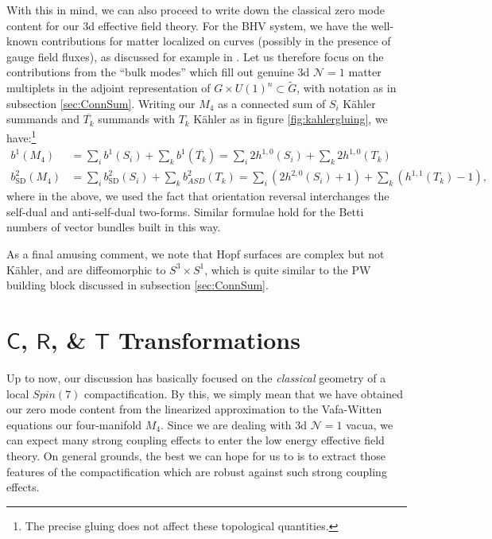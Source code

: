 \documentclass[12pt]{article}%
\numberwithin{equation}{section}
\renewcommand{\(}{\left(}
\renewcommand{\)}{\right)}
\renewcommand{\[}{\left[}
\renewcommand{\]}{\right]}
\begin{document}
With this in mind, we can also proceed to write down the classical zero mode content for our 3d effective field theory.
For the BHV system, we have the well-known contributions for matter localized on curves (possibly in the presence of gauge field fluxes), as discussed for example in \cite{Donagi:2008ca, Beasley:2008dc}. Let us therefore focus on the contributions from the ``bulk modes'' which fill out genuine 3d $\mathcal{N} = 1$ matter multiplets in the adjoint representation of $G \times U(1)^n \subset \widetilde{G} $, with notation as in subsection \ref{sec:ConnSum}. Writing our $M_4$ as a connected sum of $S_i$ K\"ahler summands and $\overline{T_k}$ summands with $T_k$ K\"ahler as in figure \ref{fig:kahlergluing}, we have:\footnote{The precise gluing does not affect these topological quantities.}
\begin{align}
b^{1}(M_4) & = \underset{i}{\sum} b^{1}(S_i) + \underset{k}{\sum} b^{1}(\overline{T_k})
= \underset{i}{\sum} 2 h^{1,0}(S_i) + \underset{k}{\sum} 2 h^{1,0}(T_k) \\
b^{2}_{\mathrm{SD}}(M_4) & =  \underset{i}{\sum} b^{2}_{\mathrm{SD}}(S_i) + \underset{k}{\sum} b^{2}_{ASD}(T_k)
= \underset{i}{\sum} (2 h^{2,0}(S_i) + 1) + \underset{k}{\sum} (h^{1,1}(T_k) - 1),
\end{align}
where in the above, we used the fact that orientation reversal interchanges the self-dual and anti-self-dual two-forms. Similar formulae hold for the Betti numbers of vector bundles built in this way.

As a final amusing comment, we note that Hopf surfaces are complex but not K\"ahler, and are diffeomorphic to
$S^{3} \times S^{1}$, which is quite similar to the PW building block discussed in subsection \ref{sec:ConnSum}.

\section{$\mathsf{C}$, $\mathsf{R}$, \& $\mathsf{T}$ Transformations \label{sec:CRT}}

Up to now, our discussion has basically focused on the \textit{classical} geometry of a local $Spin(7)$ compactification. By this, we simply mean that we have obtained our zero mode content from the linearized approximation to the Vafa-Witten equations our four-manifold $M_4$. Since we are dealing with 3d $\mathcal{N} = 1$ vacua, we can expect many strong coupling effects to enter the low energy effective field theory. On general grounds, the best we can hope for us to is to extract those features of the compactification which are robust against such strong coupling effects.
\end{document}
